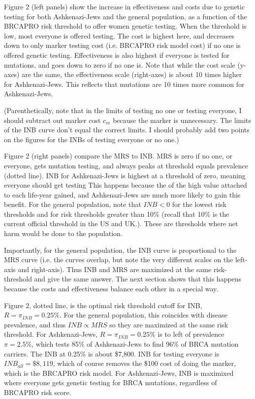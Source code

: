 \documentclass[11pt]{article}
\begin{document}
Figure 2 (left panels) show the increase in effectiveness and costs due to genetic testing for both Ashkenazi-Jews and the general population, as a function of the BRCAPRO risk threshold to offer women genetic testing.  When the threshold is low, most everyone is offered testing.  The cost is highest here, and decreases down to only marker testing cost (i.e. BRCAPRO risk model cost) if no one is offered genetic testing.  Effectiveness is also highest if everyone is tested for mutations, and goes down to zero if no one is.  Note that while the cost scale (y-axes) are the same, the effectiveness scale (right-axes) is about 10 times higher for Ashkenazi-Jews.  This reflects that mutations are 10 times more common for Ashkenazi-Jews.  

(Parenthetically, note that in the limits of testing no one or testing everyone, I should subtract out marker cost $c_m$ because the marker is unnecessary.  The limits of the INB curve don't equal the correct limits.  I should probably add two points on the figures for the INBs of testing everyone or no one.)

Figure 2 (right panels) compare the MRS to INB.  MRS is zero if no one, or everyone, gets mutation testing, and always peaks at threshold equals prevalence (dotted line).  INB for Ashkenazi-Jews is highest at a threshold of zero, meaning everyone should get testing  This happens because the of the high value attached to each life-year gained, and Ashkenazi-Jews are much more likely to gain this benefit.  For the general population, note that $INB<0$ for the lowest risk thresholds and for risk thresholds greater than 10\% (recall that 10\% is the current official threshold in the US and UK.).  These are thresholds where net harm would be done to the population.  

Importantly, for the general population, the INB curve is proportional to the MRS curve (i.e. the curves overlap, but note the very different scales on the left-axis and right-axis).  Thus INB and MRS are maximized at the same risk-threshold and give the same answer.  The next section shows that this happens because the costs and effectiveness balance each other in a special way.

Figure 2, dotted line, is the optimal risk threshold cutoff for INB, $R=\pi_{INB}=0.25\%$.  For the general population, this coincides with disease prevalence, and thus $INB\propto MRS$ so they are maximized at the same risk threshold.  For Ashkenazi-Jews, $R=\pi_{INB}=0.25\%$ is to left of prevalence $\pi=2.5\%$, which tests 85\% of Ashkenazi-Jews to find 96\% of BRCA mutation carriers.  The INB at 0.25\% is about \$7,800. INB for testing everyone is $INB_{all}=\$8,119$, which of course removes the \$100 cost of doing the marker, which is the BRCAPRO risk model.  For Ashkenazi-Jews, INB is maximixed where everyone gets genetic testing for BRCA mutations, regardless of BRCAPRO risk score.
\end{document}
